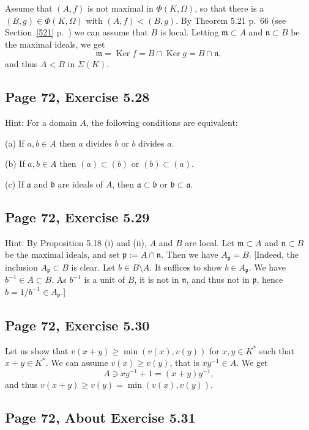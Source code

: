 \documentclass[parskip=half,fontsize=12pt]{scrartcl}%
\newcommand{\mf}{\mathfrak}
\newcommand{\aaa}{\mf a}
\newcommand{\bbb}{\mf b}
\newcommand{\mmm}{\mf m}
\newcommand{\nnn}{\mf n}
\newcommand{\ppp}{\mf p}
\newcommand{\Ker}{\operatorname{Ker}}\newcommand{\Coker}{\operatorname{Coker}}
\begin{document}
Assume that $(A,f)$ is not maximal in $\Phi(K,\Omega)$, so that there is a $(B,g)\in\Phi(K,\Omega)$ with $(A,f)<(B,g)$. By Theorem 5.21 p.~66 (see Section~\ref{521} p.~\pageref{521}) we can assume that $B$ is local. Letting $\mmm\subset A$ and $\mf n\subset B$ be the maximal ideals, we get 
$$
\mmm=\Ker f=B\cap\Ker g=B\cap\mf n,
$$ 
and thus $A<B$ in $\Sigma(K)$. 

\subsection{Page 72, Exercise 5.28}%

Hint: For a domain $A$, the following conditions are equivalent:

(a) If $a,b\in A$ then $a$ divides $b$ or $b$ divides $a$.

(b) If $a,b\in A$ then $(a)\subset(b)$ or $(b)\subset(a)$.

(c) If $\aaa$ and $\bbb$ are ideals of $A$, then $\aaa\subset\bbb$ or $\bbb\subset\aaa$.

\subsection{Page 72, Exercise 5.29}%

Hint: By Proposition 5.18 (i) and (ii), $A$ and $B$ are local. %
Let $\mmm\subset A$ and $\nnn\subset B$ be the maximal ideals, and set $\ppp:=A\cap\nnn$. Then %
we have $A_\ppp=B$. [Indeed, the inclusion $A_\ppp\subset B$ is clear. Let $b\in B\setminus A$. It suffices to show $b\in A_\ppp$. We have $b^{-1}\in A\subset B$. As $b^{-1}$ is a unit of $B$, it is not in $\nnn$, and thus not in $\ppp$, hence $b=1/b^{-1}\in A_\ppp$.]

\subsection{Page 72, Exercise 5.30}%

Let us show that $v(x+y)\ge\min(v(x),v(y))$ for $x,y\in K^*$ such that $x+y\in K^*$. We can assume $v(x)\ge v(y)$, that is $xy^{-1}\in A$. We get 
$$
A\ni xy^{-1}+1=(x+y)y^{-1},
$$ 
and thus $v(x+y)\ge v(y)=\min(v(x),v(y))$.

\subsection{Page 72, About Exercise 5.31}%
\end{document}
